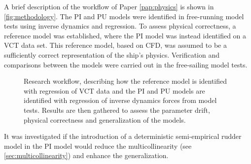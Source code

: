 A brief description of the workflow of Paper \ref{pap:physics} is shown in \autoref{fig:methodology}.
The PI and PU models were identified in free-running model tests using inverse dynamics and regression. To assess physical correctness, a reference model was established, where the PI model was instead identified on a VCT data set. This reference model, based on CFD, was assumed to be a sufficiently correct representation of the ship's physics.
Verification and comparisons between the models were carried out in the free-sailing model tests.
\begin{figure}[h]
  \centering
  
  \caption{Research workflow, describing how the reference model is identified with regression of VCT data and the PI and PU models are identified with regression of inverse dynamics forces from model tests. Results are then gathered to assess the parameter drift, physical correctness and generalization of the models.}
  \label{fig:methodology}
\end{figure}
It was investigated if the introduction of a deterministic semi-empirical rudder model in the PI model would reduce the multicollinearity (see \autoref{sec:multicollinearity}) and enhance the generalization.

\FloatBarrier
